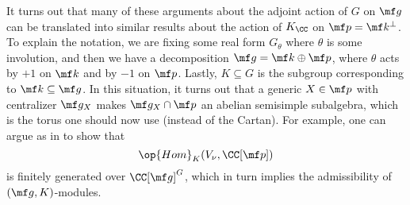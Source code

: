 \documentclass[../notes.tex]{subfiles}
\begin{document}
\begin{remark}
	It turns out that many of these arguments about the adjoint action of $G$ on $\mf g$ can be translated into similar results about the action of $K_\CC$ on $\mf p=\mf k^\perp$. To explain the notation, we are fixing some real form $G_\theta$ where $\theta$ is some involution, and then we have a decomposition $\mf g=\mf k\oplus\mf p$, where $\theta$ acts by $+1$ on $\mf k$ and by $-1$ on $\mf p$. Lastly, $K\subseteq G$ is the subgroup corresponding to $\mf k\subseteq\mf g$. In this situation, it turns out that a generic $X\in\mf p$ with centralizer $\mf g_X$ makes $\mf g_X\cap\mf p$ an abelian semisimple subalgebra, which is the torus one should now use (instead of the Cartan). For example, one can argue as in  to show that
	\[\op{Hom}_K(V_\nu,\CC[\mf p])\]
	is finitely generated over $\CC[\mf g]^G$, which in turn implies the admissibility of $(\mf g,K)$-modules.
\end{remark}
\end{document}
